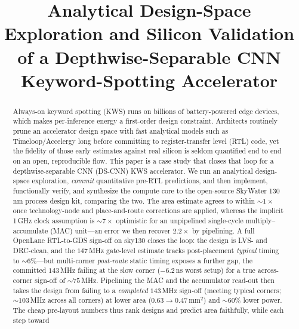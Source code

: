 \documentclass[conference]{IEEEtran}
\newcommand{\x}{\ensuremath{\times}}
\newcommand{\approxs}{\ensuremath{\sim}}
\begin{document}
\title{Analytical Design-Space Exploration and Silicon Validation\\
of a Depthwise-Separable CNN Keyword-Spotting Accelerator}

\author{
}

\maketitle

\begin{abstract}
\normalfont
Always-on keyword spotting (KWS) runs on billions of battery-powered edge
devices, which makes per-inference energy a first-order design constraint.
Architects routinely prune an accelerator design space with fast analytical
models such as Timeloop/Accelergy long before committing to register-transfer
level (RTL) code, yet the fidelity of those early estimates against real silicon
is seldom quantified end to end on an open, reproducible flow. This paper is a
case study that closes that loop for a depthwise-separable CNN (DS-CNN) KWS
accelerator. We run an analytical design-space exploration, \emph{commit}
quantitative pre-RTL predictions, and then implement, functionally verify, and
synthesize the compute core to the open-source SkyWater 130\,nm process design
kit, comparing the two. The area estimate agrees to within \approxs$1\x$ once
technology-node and place-and-route corrections are applied, whereas the
implicit 1\,GHz clock assumption is \approxs$7\x$ optimistic for an unpipelined
single-cycle multiply--accumulate (MAC) unit---an error we then recover $2.2\x$
by pipelining. A full OpenLane RTL-to-GDS sign-off on sky130 closes the loop: the
design is LVS- and DRC-clean, and the $147$\,MHz gate-level estimate tracks
post-placement \emph{typical} timing to \approxs$6\%$---but multi-corner
\emph{post-route} static timing exposes a further gap, the committed $143$\,MHz
failing at the slow corner ($-6.2$\,ns worst setup) for a true across-corner
sign-off of \approxs$75$\,MHz. Pipelining the MAC and the accumulator read-out
then takes the design from failing to a \emph{completed} $143$\,MHz sign-off
(meeting typical corners; \approxs$103$\,MHz across all corners) at lower area
($0.63{\to}0.47$\,mm$^2$) and \approxs$60\%$ lower power. The cheap pre-layout
numbers thus rank designs and predict area faithfully, while each step toward

\end{abstract}
\end{document}
